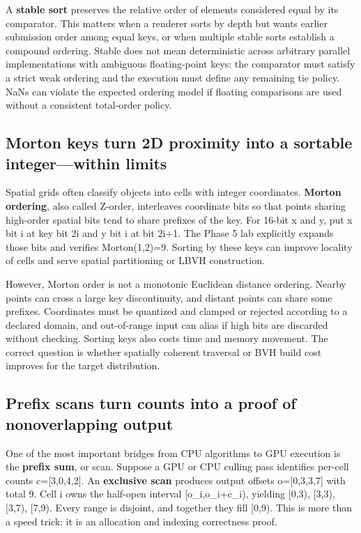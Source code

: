A \textbf{stable sort} preserves the relative order of elements considered equal by its comparator. This matters when a renderer sorts by depth but wants earlier submission order among equal keys, or when multiple stable sorts establish a compound ordering. Stable does not mean deterministic across arbitrary parallel implementations with ambiguous floating-point keys: the comparator must satisfy a strict weak ordering and the execution must define any remaining tie policy. NaNs can violate the expected ordering model if floating comparisons are used without a consistent total-order policy.

\subsection{Morton keys turn 2D proximity into a sortable integer---within limits}\label{05-engine-i-ch008-morton-keys-turn-2d-proximity-into-a-sortable-integerwithin-limits}

Spatial grids often classify objects into cells with integer coordinates. \textbf{Morton ordering}, also called Z-order, interleaves coordinate bits so that points sharing high-order spatial bits tend to share prefixes of the key. For 16-bit x and y, put x bit i at key bit 2i and y bit i at bit 2i+1. The Phase 5 lab explicitly expands those bits and verifies Morton(1,2)=9. Sorting by these keys can improve locality of cells and serve spatial partitioning or LBVH construction.

However, Morton order is not a monotonic Euclidean distance ordering. Nearby points can cross a large key discontinuity, and distant points can share some prefixes. Coordinates must be quantized and clamped or rejected according to a declared domain, and out-of-range input can alias if high bits are discarded without checking. Sorting keys also costs time and memory movement. The correct question is whether spatially coherent traversal or BVH build cost improves for the target distribution.

\subsection{Prefix scans turn counts into a proof of nonoverlapping output}\label{05-engine-i-ch008-prefix-scans-turn-counts-into-a-proof-of-nonoverlapping-output}

One of the most important bridges from CPU algorithms to GPU execution is the \textbf{prefix sum}, or scan. Suppose a GPU or CPU culling pass identifies per-cell counts c={[}3,0,4,2{]}. An \textbf{exclusive scan} produces output offsets o={[}0,3,3,7{]} with total 9. Cell i owns the half-open interval {[}o\_i,o\_i+c\_i), yielding {[}0,3), {[}3,3), {[}3,7), {[}7,9). Every range is disjoint, and together they fill {[}0,9). This is more than a speed trick: it is an allocation and indexing correctness proof.

